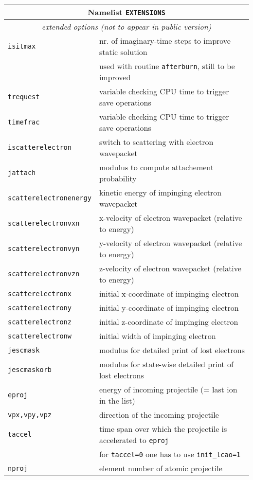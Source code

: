 \documentclass[12pt]{article}
\begin{document}
\begin{tabular}{ll}
\hline
\multicolumn{2}{c}{Namelist {\tt EXTENSIONS}} in {\tt for005.<name>} \\
\hline
\multicolumn{2}{c}{\it extended options (not to appear in public version)} \\
\hline
{\tt isitmax          }& nr. of imaginary-time steps to improve static
solution
\\
& used with routine {\tt afterburn}, still to be improved\\
{\tt trequest} &  variable checking CPU time to trigger save
operations \\
{\tt timefrac} &  variable checking CPU time to trigger save operations  \\
{\tt iscatterelectron} &  switch to scattering with electron wavepacket\\
{\tt jattach} &  modulus to compute attachement probability\\
{\tt scatterelectronenergy} &  kinetic energy of impinging electron wavepacket\\
{\tt scatterelectronvxn} &  x-velocity  of electron
wavepacket (relative to energy)\\
{\tt scatterelectronvyn} &  y-velocity  of electron
wavepacket (relative to energy) \\
{\tt scatterelectronvzn} &  z-velocity  of electron
wavepacket (relative to energy) \\
{\tt scatterelectronx} & initial x-coordinate of impinging electron \\
{\tt scatterelectrony} & initial y-coordinate of impinging electron  \\
{\tt scatterelectronz} & initial z-coordinate of impinging electron  \\
{\tt scatterelectronw} & initial width  of impinging electron \\
{\tt jescmask} & modulus for detailed print of lost electrons \\
{\tt jescmaskorb} & modulus for state-wise detailed print of lost electrons \\
{\tt eproj}& energy of incoming projectile (= last ion in the list)
\\
{\tt vpx,vpy,vpz}& direction of the incoming projectile
\\
{\tt taccel}& time span over which the projectile is accelerated to
             {\tt eproj}\\
& for {\tt taccel=0} one has to use {\tt init\_lcao=1}\\
{\tt nproj} & element number of atomic projectile \\

\end{tabular}
\end{document}
